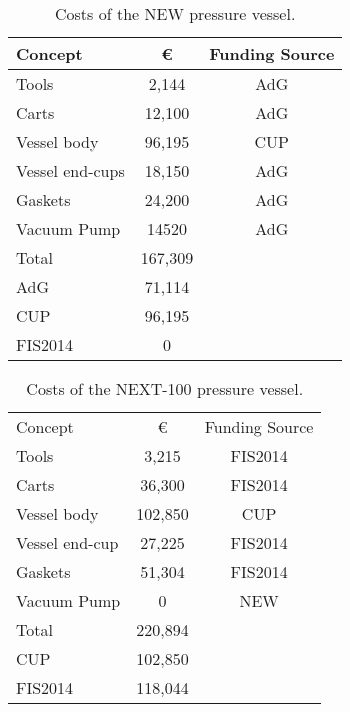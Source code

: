 \begin{table}[h!]
\begin{center}
\begin{tabular}{|l|c|c|}
\hline
 Concept & \euro & Funding Source \\
 \hline
Tools &	2,144 &	AdG \\
Carts	& 12,100	& AdG \\
Vessel body &	96,195 & CUP \\
Vessel end-cups	& 18,150 & 	AdG \\
Gaskets	& 24,200	& AdG \\
Vacuum Pump	& 14520	& AdG \\
\hline
Total	& 167,309 & \\	
AdG	& 71,114 & \\	
CUP & 96,195 & \\
FIS2014 & 0 & \\	
\hline\hline
\end{tabular}  
\caption{Costs of the NEW pressure vessel. }
\label{tab:PV}
\end{center}
\end{table} 

\begin{table}[h!]
\begin{center}
\begin{tabular}{|l|c|c|}
\hline
 Concept & \euro & Funding Source \\
 Tools &	3,215 & 	FIS2014 \\
Carts &	36,300 &	FIS2014 \\
Vessel body &	102,850 &	CUP \\
Vessel end-cup	 & 27,225 &	FIS2014 \\
Gaskets	& 51,304	& FIS2014 \\
Vacuum Pump &	0 &	NEW \\
 \hline
Total	& 220,894 & \\	
CUP	& 102,850 & \\	
FIS2014	& 118,044 & \\	
 \hline
\hline\hline
\end{tabular}  
\caption{Costs of the NEXT-100 pressure vessel.}
\label{tab:PV}
\end{center}
\end{table} 


